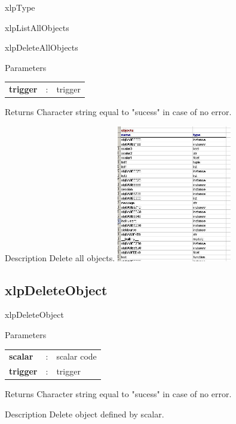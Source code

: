 \begin{xlpfunctitle}{xlpType}
\begin{xlpfunctitle}{xlpListAllObjects}
\begin{xlpfunctitle}{xlpDeleteAllObjects}

\begin{xlpfunc}{Parameters}
\begin{tabular}{p{3.5cm}cl}
\textbf{trigger}& : & trigger 
\end{tabular}
\end{xlpfunc}


\begin{xlpfunc}{Returns}
Character string equal to "sucess" in case of no error.
\end{xlpfunc}

\begin{xlpfunc}{Description}
Delete all objects.
\includegraphics[width=5cm]{images/objects.jpg}
\end{xlpfunc}

\subsection{xlpDeleteObject}

\begin{xlpfunctitle}{xlpDeleteObject}

\begin{xlpfunc}{Parameters}
\begin{tabular}{p{3.5cm}cl}
\textbf{scalar}& : & scalar code \\
\textbf{trigger}& : & trigger 
\end{tabular}
\end{xlpfunc}


\begin{xlpfunc}{Returns}
Character string equal to "sucess" in case of no error.
\end{xlpfunc}

\begin{xlpfunc}{Description}
Delete object defined by scalar.
\end{xlpfunc}


\end{xlpfunctitle}
\end{xlpfunctitle}
\end{xlpfunctitle}
\end{xlpfunctitle}
